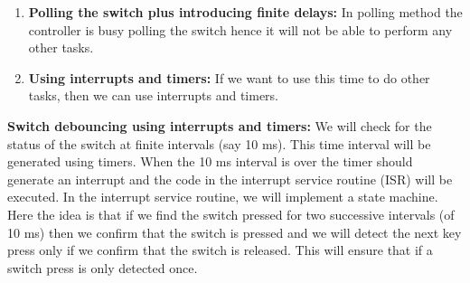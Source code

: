 \documentclass{article} %
\newcounter{other}
\begin{document}
\begin{enumerate}
\item  \textbf{Polling the switch plus introducing finite delays:} 
In polling method the controller is busy polling the switch hence it will not be able to perform any other tasks.
\item \textbf{Using interrupts and timers:} If we want to use this time to do other tasks, then we can use interrupts and timers. \\ 
\end{enumerate}
\textbf{Switch debouncing using interrupts and timers:} We will check for the status of the switch at finite intervals (say 10 ms). This time interval will be generated using timers. When the 10 ms interval is over the timer should generate an interrupt and the code in the interrupt service routine (ISR) will be executed. In the interrupt service routine, we will implement a state machine. Here the idea is that if we find the switch pressed for two successive intervals (of 10 ms) then we confirm that the switch is pressed and we will detect the next key press only if we confirm that the switch is released. This will ensure that if a switch press is only detected once. 
\end{document}
